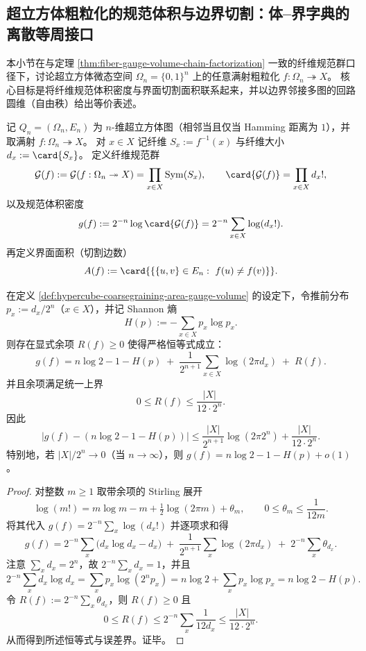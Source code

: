 \subsection{超立方体粗粒化的规范体积与边界切割：体--界字典的离散等周接口}\label{subsec:fold-hypercube-bulk-boundary-gauge-volume}
本小节在与定理 \ref{thm:fiber-gauge-volume-chain-factorization} 一致的纤维规范群口径下，讨论超立方体微态空间 \(\Omega_n=\{0,1\}^n\) 上的任意满射粗粒化 \(f:\Omega_n\twoheadrightarrow X\)。
核心目标是将纤维规范体积密度与界面切割面积联系起来，并以边界邻接多图的回路圆维（自由秩）给出等价表述。

\begin{definition}[超立方体粗粒化的界面面积与规范体积密度]\label{def:hypercube-coarsegraining-area-gauge-volume}
记 \(Q_n=(\Omega_n,E_n)\) 为 \(n\)-维超立方体图（相邻当且仅当 Hamming 距离为 \(1\)），并取满射 \(f:\Omega_n\twoheadrightarrow X\)。
对 \(x\in X\) 记纤维 \(S_x:=f^{-1}(x)\) 与纤维大小 \(d_x:=\card{S_x}\)。
定义纤维规范群
\[
\mathcal G(f):=\mathcal G(f:\Omega_n\twoheadrightarrow X)
=\prod_{x\in X}\mathrm{Sym}(S_x),
\qquad
\card{\mathcal G(f)}=\prod_{x\in X} d_x!,
\]
以及规范体积密度
\[
g(f):=2^{-n}\log\card{\mathcal G(f)}=2^{-n}\sum_{x\in X}\log(d_x!).
\]
再定义界面面积（切割边数）
\[
A(f):=\card{\{\{u,v\}\in E_n:\ f(u)\neq f(v)\}}.
\]
\end{definition}

\begin{theorem}\label{thm:hypercube-gauge-volume-shannon-stirling-gap}
在定义 \ref{def:hypercube-coarsegraining-area-gauge-volume} 的设定下，令推前分布 \(p_x:=d_x/2^n\)（\(x\in X\)），并记 Shannon 熵
\[
H(p):=-\sum_{x\in X}p_x\log p_x.
\]
则存在显式余项 \(R(f)\ge 0\) 使得严格恒等式成立：
\[
\boxed{\;
g(f)=n\log 2-1-H(p)
\;+\;\frac1{2^{n+1}}\sum_{x\in X}\log(2\pi d_x)
\;+\;R(f).
\;}
\]
并且余项满足统一上界
\[
0\le R(f)\le \frac{|X|}{12\cdot 2^n}.
\]
因此
\[
\bigl|g(f)-(n\log 2-1-H(p))\bigr|
\le
\frac{|X|}{2^{n+1}}\log(2\pi 2^n)+\frac{|X|}{12\cdot 2^n}.
\]
特别地，若 \(|X|/2^n\to 0\)（当 \(n\to\infty\)），则
\(
g(f)=n\log 2-1-H(p)+o(1)
\)。
\end{theorem}
\begin{proof}
对整数 \(m\ge 1\) 取带余项的 Stirling 展开
\[
\log(m!)=m\log m-m+\tfrac12\log(2\pi m)+\theta_m,
\qquad
0\le \theta_m\le \frac1{12m}.
\]
将其代入 \(g(f)=2^{-n}\sum_x\log(d_x!)\) 并逐项求和得
\[
g(f)
=2^{-n}\sum_x\bigl(d_x\log d_x-d_x\bigr)
\;+\;\frac1{2^{n+1}}\sum_x\log(2\pi d_x)
\;+\;2^{-n}\sum_x\theta_{d_x}.
\]
注意 \(\sum_x d_x=2^n\)，故 \(2^{-n}\sum_x d_x=1\)，并且
\[
2^{-n}\sum_x d_x\log d_x
=\sum_x p_x\log(2^n p_x)
=n\log 2+\sum_x p_x\log p_x
=n\log 2-H(p).
\]
令
\(
R(f):=2^{-n}\sum_x\theta_{d_x}
\)，则 \(R(f)\ge 0\) 且
\[
0\le R(f)\le 2^{-n}\sum_x\frac1{12d_x}\le \frac{|X|}{12\cdot 2^n}.
\]
从而得到所述恒等式与误差界。证毕。
\end{proof}

